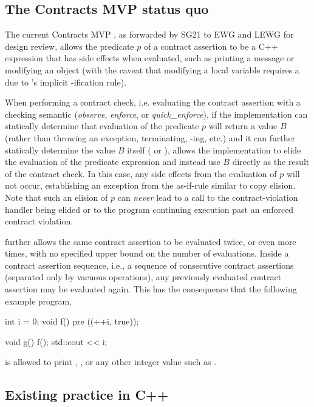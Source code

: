 \subsection{The Contracts MVP status quo}

The current Contracts MVP \cite{P2900R6}, as forwarded by SG21 to EWG and LEWG for design review, allows the predicate $p$ of a contract assertion to be a C++ expression that has side effects when evaluated, such as printing a message or modifying an object (with the caveat that modifying a local variable requires a  due to \cite{P2900R6}'s implicit -ification rule).

When performing a contract check, i.e. evaluating the contract assertion with a checking semantic (\emph{observe}, \emph{enforce}, or \emph{quick_enforce}), if the implementation can statically determine that evaluation of the predicate $p$ will return a value $B$ (rather than throwing an exception, terminating, -ing, etc.) and it can further statically determine the value $B$ itself ( or ), \cite{P2900R6} allows the implementation to elide the evaluation of the predicate expression and instead use $B$ directly as the result of the contract check. In this case, any side effects from the evaluation of $p$ will not occur, establishing an exception from the as-if-rule similar to copy elision. Note that such an elision of $p$ can \emph{never} lead to a call to the contract-violation handler being elided or to the program continuing execution past an enforced contract violation.

\cite{P2900R6} further allows the same contract assertion to be evaluated twice, or even more times, with no specified upper bound on the number of evaluations. Inside a contract assertion sequence, i.e., a sequence of consecutive contract assertions (separated only by vacuous operations), any previously evaluated contract assertion may be evaluated again. This has the consequence that the following example program,
\begin{codeblock}
int i = 0; 
void f() pre ((++i, true)); 

void g() { 
  f(); 
  std::cout << i;
}
\end{codeblock}
is allowed to print , , or any other integer value such as .


\subsection{Existing practice in C++}
\label{subsec:cppexisting}

